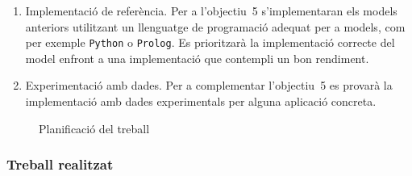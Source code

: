 \begin{enumerate}
\item Implementació de referència. Per a l'objectiu~5 s'implementaran
  els models anteriors utilitzant un llenguatge de programació adequat
  per a models, com per exemple \texttt{Python} o \texttt{Prolog}.  Es
  prioritzarà la implementació correcte del model enfront a una
  implementació que contempli un bon rendiment. 

\item Experimentació amb dades. Per a complementar l'objectiu~5 es
  provarà la implementació amb dades experimentals per alguna
  aplicació concreta.

\end{enumerate}

\begin{figure}[tp]
\centering
{}
\caption{Planificació del treball}
\label{fig:pla:futur}
\end{figure}



\subsubsection*{Treball realitzat}


